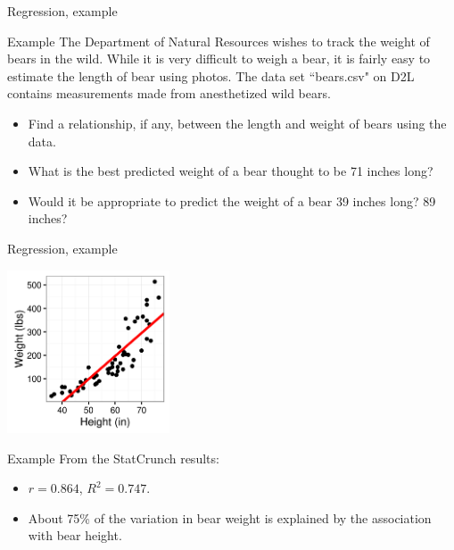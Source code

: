 \documentclass[xcolor=table, handout]{beamer}
\begin{document}
\begin{frame}{Regression, example}
\begin{exampleblock}{Example}
\large
The Department of Natural Resources wishes to track the weight of bears in the wild. While it is very difficult to weigh a bear, it is fairly easy to estimate the length of bear using photos. The data set ``bears.csv" on D2L contains measurements made from anesthetized wild bears.\\
\begin{itemize}
\item Find a relationship, if any, between the length and weight of bears using the data.
\item What is the best predicted weight of a bear thought to be 71 inches long?
\item Would it be appropriate to predict the weight of a bear 39 inches long? 89 inches?
\end{itemize}
\end{exampleblock}
\end{frame}

\begin{frame}{Regression, example}

\smallskip
{\centering
\includegraphics[width=1.9in]{../images/ch10_reg_bears}
\par}

\pause
\begin{exampleblock}{Example}
\large
From the StatCrunch results:
\begin{itemize}
\item $r = 0.864$, $R^2 = 0.747$.
\item About 75\% of the variation in bear weight is explained by the association with bear height.
\end{itemize}
\end{exampleblock}

\end{frame}
\end{document}
